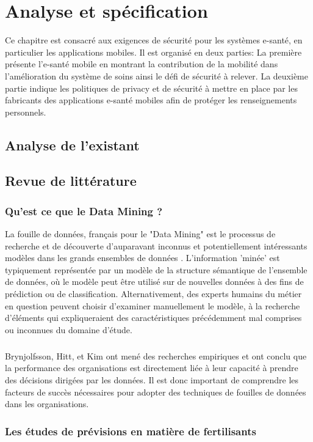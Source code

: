 \chapter{Analyse et spécification}

Ce chapitre est consacré aux exigences de sécurité pour les systèmes e-santé, en particulier les applications mobiles. Il est organisé en deux parties: La première présente l'e-santé mobile en montrant la contribution de la mobilité dans l'amélioration du système de soins ainsi le défi de sécurité à relever. La deuxième partie indique les politiques de privacy et de sécurité à mettre en place par les fabricants des applications e-santé mobiles afin de protéger les renseignements personnels.
\cleardoublepage

\section{Analyse de l’existant}
\section{Revue de littérature}
\subsection{Qu'est ce que le Data Mining ?}
La fouille de données, français pour le "Data Mining" est le processus de recherche et de découverte d'auparavant inconnus et potentiellement intéressants modèles dans les grands ensembles de données \cite{def-DM}. L'information 'minée' est typiquement représentée par un modèle de la structure sémantique de l'ensemble de données, où le modèle peut être utilisé sur de nouvelles données à des fins de prédiction ou de classification. Alternativement, des experts humains du métier en question peuvent choisir d'examiner manuellement le modèle, à la recherche d'éléments qui expliqueraient des caractéristiques précédemment mal comprises ou inconnues du domaine d'étude.
\paragraph{}
Brynjolfsson, Hitt, et Kim\cite{data-driven-des} ont mené des recherches empiriques et ont conclu que la performance des organisations est directement liée à leur capacité à prendre des décisions dirigées par les données. Il est donc important de comprendre les facteurs de succès nécessaires pour adopter des techniques de fouilles de données dans les organisations.
\subsection{Les études de prévisions en matière de fertilisants}
